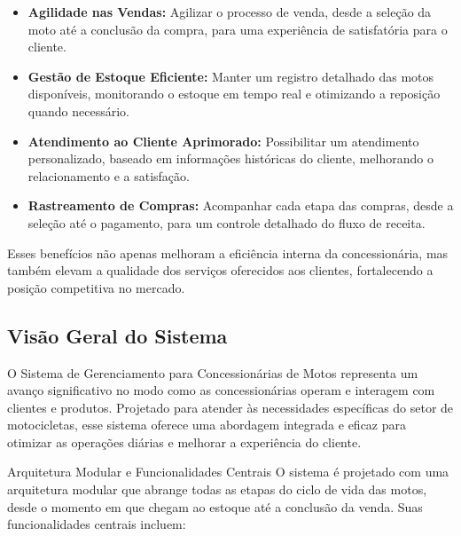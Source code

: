 		\begin{itemize}
			\item \textbf{Agilidade nas Vendas:}  Agilizar o processo de venda, desde a seleção da moto até a conclusão da compra, para uma experiência de satisfatória para o cliente.
			
			\item \textbf{Gestão de Estoque Eficiente:} Manter um registro detalhado das motos disponíveis, monitorando o estoque em tempo real e otimizando a reposição quando necessário.
			
			\item \textbf{Atendimento ao Cliente Aprimorado:} Possibilitar um atendimento personalizado, baseado em informações históricas do cliente, melhorando o relacionamento e a satisfação.
			
			\item \textbf{Rastreamento de Compras:} Acompanhar cada etapa das compras, desde a seleção até o pagamento, para um controle detalhado do fluxo de receita.
			
		\end{itemize}
		 
		 Esses benefícios não apenas melhoram a eficiência interna da concessionária, mas também elevam a qualidade dos serviços oferecidos aos clientes, fortalecendo a posição competitiva no mercado.
		 
        \subsection{Visão Geral do Sistema}
        O Sistema de Gerenciamento para Concessionárias de Motos representa um avanço significativo no modo como as concessionárias operam e interagem com clientes e produtos. Projetado para atender às necessidades específicas do setor de motocicletas, esse sistema oferece uma abordagem integrada e eficaz para otimizar as operações diárias e melhorar a experiência do cliente.
        
        Arquitetura Modular e Funcionalidades Centrais
        O sistema é projetado com uma arquitetura modular que abrange todas as etapas do ciclo de vida das motos, desde o momento em que chegam ao estoque até a conclusão da venda. Suas funcionalidades centrais incluem:
        
